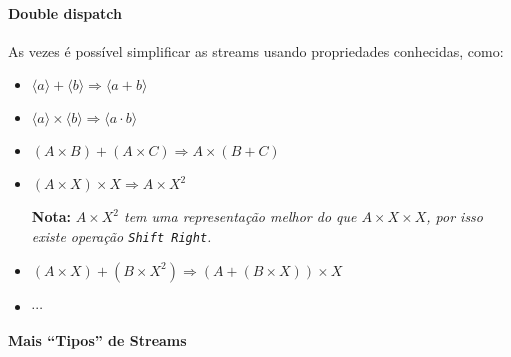 \documentclass{article}
\newcommand{\To}{\Rightarrow}
\newcommand{\note}[1]{\textbf{Nota:} \textit{#1}}
\newcommand{\ins}[1]{\langle #1 \rangle}
\begin{document}
\paragraph{Double dispatch}

As vezes é possível simplificar as streams
usando propriedades conhecidas, como:
\begin{itemize}
    \item \(\ins{a} + \ins{b} \To \ins{a + b}\)
    \item \(\ins{a} \times \ins{b} \To \ins{a \cdot b}\)
    \item \((A \times B) + (A \times C) \To A \times (B + C)\)
    \item \((A \times X) \times X \To A \times X^2\)
        \par\note{\(A \times X^2\) tem uma representação melhor
        do que \(A \times X \times X\),
        por isso existe operação \texttt{Shift Right}.}
    \item \((A \times X) + (B \times X^2)
        \To (A + (B \times X)) \times X\)
    \item \(\cdots\)
\end{itemize}

\paragraph{Mais ``Tipos'' de Streams}
\end{document}
